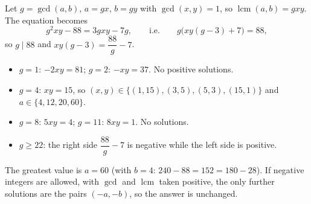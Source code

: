 Let $g=\gcd(a,b)$, $a=gx$, $b=gy$ with $\gcd(x,y)=1$, so $\operatorname{lcm}(a,b)=gxy$. The equation becomes
\[g^2xy-88=3gxy-7g,\qquad\text{i.e.}\qquad g\bigl(xy(g-3)+7\bigr)=88,\]
so $g\mid88$ and $xy(g-3)=\dfrac{88}{g}-7$.
\begin{itemize}
\item $g=1$: $-2xy=81$; $g=2$: $-xy=37$. No positive solutions.
\item $g=4$: $xy=15$, so $(x,y)\in\{(1,15),(3,5),(5,3),(15,1)\}$ and $a\in\{4,12,20,60\}$.
\item $g=8$: $5xy=4$; $g=11$: $8xy=1$. No solutions.
\item $g\ge22$: the right side $\dfrac{88}{g}-7$ is negative while the left side is positive.
\end{itemize}
The greatest value is $a=\boxed{60}$ (with $b=4$: $240-88=152=180-28$). If negative integers are allowed, with $\gcd$ and $\operatorname{lcm}$ taken positive, the only further solutions are the pairs $(-a,-b)$, so the answer is unchanged.
